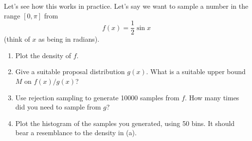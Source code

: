 \documentclass[11pt]{article}
\begin{document}
\begin{enumerate}
Let's see how this works in practice. Let's say we want to sample a number in the range $[0, \pi]$ from
\[
f(x) = \frac{1}{2} \sin x
\]
(think of $x$ as being in radians).

\begin{enumerate}
\item Plot the density of $f$.

\item Give a suitable proposal distribution $g(x)$. What is a suitable upper bound $M$ on $f(x)/g(x)$?

\item Use rejection sampling to generate 10000 samples from $f$. How many times did you need to sample from $g$?

\item Plot the histogram of the samples you generated, using 50 bins. It should bear a resemblance to the density in (a).
\end{enumerate}

\end{enumerate}
\end{document}
